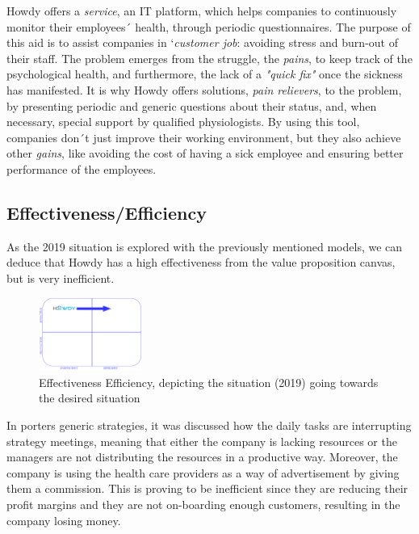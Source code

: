 \noindent Howdy offers a \textit{service}, an IT platform, which helps companies to continuously monitor their employees´ health, through periodic questionnaires. The purpose of this aid is to assist companies in ‘\textit{customer job}: avoiding stress and burn-out of their staff. 
The problem emerges from the struggle, the \textit{pains}, to keep track of the psychological health, and furthermore, the lack of a \textit{"quick fix"} once the sickness has manifested. It is why Howdy offers solutions, \textit{pain relievers}, to the problem, by presenting periodic and generic questions about their status, and, when necessary, special support by qualified physiologists.    
By using this tool, companies don´t just improve their working environment, but they also achieve other \textit{gains}, like avoiding the cost of having a sick employee and ensuring better performance of the employees.


\subsection{Effectiveness/Efficiency}

As the 2019 situation is explored with the previously mentioned models, we can deduce that Howdy has a high effectiveness from the value proposition canvas, but is very inefficient. 

\begin{figure}
\centering
\includegraphics[width=0.3\textwidth]{figures/effiTEMO.png}
\caption{Effectiveness Efficiency, depicting the situation (2019) going towards the desired situation}
\label{fig:eff}
\end{figure}

\noindent In porters generic strategies, it was discussed how the daily tasks are interrupting strategy meetings, meaning that either the company is lacking resources or the managers are not distributing the resources in a productive way. Moreover, the company is using the health care providers as a way of advertisement by giving them a commission. This is proving to be inefficient since they are reducing their profit margins and they are not on-boarding enough customers, resulting in the company losing money.

